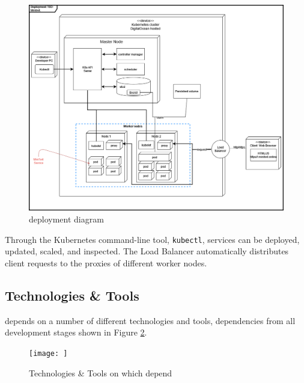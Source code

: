 \begin{figure}[H]
    \centering
    \includegraphics[scale=0.418]{images/deployment_diagrams/devopsdiagrams-deployment k8s.drawio(1).png}
    \caption{\mini deployment diagram}
    \label{fig:figdeploy}
\end{figure}
Through the Kubernetes command-line tool, \texttt{kubectl}, services can be deployed, updated, scaled, and inspected. The Load Balancer automatically distributes client requests to the proxies of different worker nodes.

\subsection{Technologies \& Tools}
\label{subsec:techs}
\mini depends on a number of different technologies and tools, dependencies from all development stages shown in Figure \ref{fig:dependencies}. 
\begin{figure}[H]
    \centering
    \texttt{[image: ]}
    \caption{Technologies \& Tools on which \mini depend}
    \label{fig:dependencies}
\end{figure}


